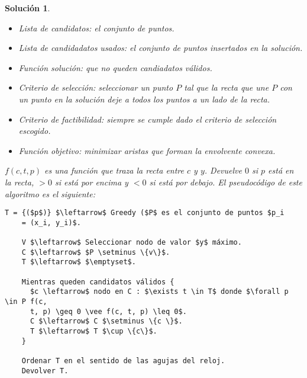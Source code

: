 \documentclass[11pt, a4paper]{article}
\newif\IfInSansMode
\theoremstyle{theorem-style}
\theoremstyle{definition-style}
\theoremstyle{remark-style}
\newtheorem*{sol}{Solución}
\theoremstyle{example-style}
\begin{document}
\begin{sol}
  \begin{itemize}
  \item Lista de candidatos: el conjunto de puntos.
  \item Lista de candidadatos usados: el conjunto de puntos insertados en la
    solución.
  \item Función solución: que no queden candiadatos válidos.
  \item Criterio de selección: seleccionar un punto $P$ tal que la recta que une
    $P$ con un punto en la solución deje a todos los puntos a un lado de la
    recta.
  \item Criterio de factibilidad: siempre se cumple dado el criterio de
    selección escogido.
  \item Función objetivo: minimizar aristas que forman la \textit{envolvente convexa}.
  \end{itemize}

  $f(c, t, p)$ es una función que traza la recta entre $c$ y $y$. Devuelve $0$ si
  $p$ está en la recta, $> 0$ si está por encima y $< 0$ si está por debajo. El
  pseudocódigo de este algoritmo es el siguiente:

  \begin{lstlisting}[mathescape=true]
    T = {($p$)} $\leftarrow$ Greedy ($P$ es el conjunto de puntos $p_i
    = (x_i, y_i)$.

    V $\leftarrow$ Seleccionar nodo de valor $y$ máximo.
    C $\leftarrow$ $P \setminus \{v\}$.
    T $\leftarrow$ $\emptyset$.

    Mientras queden candidatos válidos {
      $c \leftarrow$ nodo en C : $\exists t \in T$ donde $\forall p \in P f(c,
      t, p) \geq 0 \vee f(c, t, p) \leq 0$.
      C $\leftarrow$ C $\setminus \{c \}$.
      T $\leftarrow$ T $\cup \{c\}$.
    }

    Ordenar T en el sentido de las agujas del reloj.
    Devolver T.
    
  \end{lstlisting}
  
\end{sol}
\end{document}
